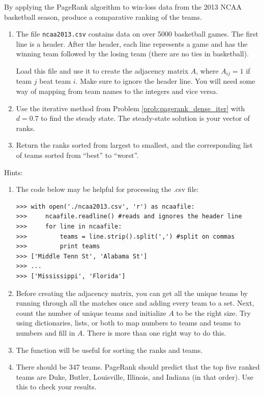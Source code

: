 \begin{problem}
By applying the PageRank algorithm to win-loss data from the 2013 NCAA basketball season, produce a comparative ranking of the teams.
\begin{enumerate}
\item The file  \texttt{ncaa2013.csv} contains data on over 5000 basketball games.
The first line is a header.
After the header, each line represents a game and has the winning team followed by the losing team (there are no ties in basketball).

Load this file and use it to create the adjacency matrix $A$, where $A_{ij} = 1$ if team $j$ beat team $i$.
Make sure to ignore the header line.
You will need some way of mapping from team names to the integers and vice versa.
\item Use the iterative method from Problem \ref{prob:pagerank_dense_iter} with $d = 0.7$ to find the steady state.
The steady-state solution is your vector of ranks.
\item Return the ranks sorted from largest to smallest, and the corresponding list of teams sorted from ``best'' to ``worst''.
\end{enumerate}
Hints:
\begin{enumerate}
\item The code below may be helpful for processing the .csv file:
\begin{lstlisting}
>>> with open('./ncaa2013.csv', 'r') as ncaafile:
>>>     ncaafile.readline() #reads and ignores the header line
>>>     for line in ncaafile:
>>>         teams = line.strip().split(',') #split on commas
>>>         print teams
>>> ['Middle Tenn St', 'Alabama St']
>>> ...
>>> ['Mississippi', 'Florida']
\end{lstlisting}
\item Before creating the adjacency matrix, you can get all the unique teams by running through all the matches once and adding every team to a set.
Next, count the number of unique teams and initialize $A$ to be the right size.
Try using dictionaries, lists, or both to map numbers to teams and teams to numbers and fill in $A$.
There is more than one right way to do this.
\item The function  will be useful for sorting the ranks and teams.
\item There should be 347 teams. PageRank should predict that the top five ranked teams are Duke, Butler, Louisville, Illinois, and Indiana (in that order). Use this to check your results.
\end{enumerate}
\end{problem}

